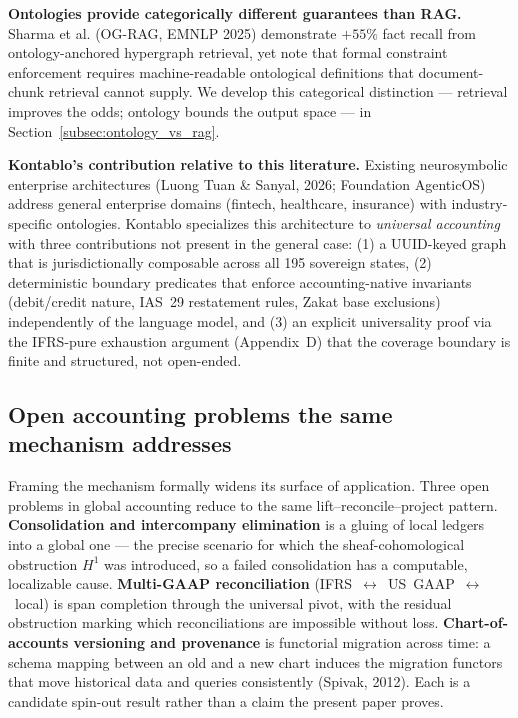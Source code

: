 \textbf{Ontologies provide categorically different guarantees than RAG.}
Sharma et al. (OG-RAG, EMNLP 2025) demonstrate $+55\%$ fact recall from
ontology-anchored hypergraph retrieval, yet note that formal constraint
enforcement requires machine-readable ontological definitions that
document-chunk retrieval cannot supply. We develop this categorical distinction
--- retrieval improves the odds; ontology bounds the output space --- in
Section~\ref{subsec:ontology_vs_rag}.

\textbf{Kontablo's contribution relative to this literature.}
Existing neurosymbolic enterprise architectures (Luong Tuan \& Sanyal, 2026;
Foundation AgenticOS) address general enterprise domains (fintech, healthcare,
insurance) with industry-specific ontologies. Kontablo specializes this
architecture to \emph{universal accounting} with three contributions not
present in the general case: (1) a UUID-keyed graph that is jurisdictionally
composable across all 195 sovereign states, (2) deterministic boundary
predicates that enforce accounting-native invariants (debit/credit nature,
IAS~29 restatement rules, Zakat base exclusions) independently of the
language model, and (3) an explicit universality proof via the IFRS-pure
exhaustion argument (Appendix~D) that the coverage boundary is finite and
structured, not open-ended.

\subsection{Open accounting problems the same mechanism addresses}
Framing the mechanism formally widens its surface of application. Three open problems in
global accounting reduce to the same lift--reconcile--project pattern. \textbf{Consolidation
and intercompany elimination} is a gluing of local ledgers into a global one --- the precise
scenario for which the sheaf-cohomological obstruction $H^{1}$ was introduced, so a failed
consolidation has a computable, localizable cause. \textbf{Multi-GAAP reconciliation}
(IFRS~$\leftrightarrow$~US~GAAP~$\leftrightarrow$~local) is span completion through the
universal pivot, with the residual obstruction marking which reconciliations are impossible
without loss. \textbf{Chart-of-accounts versioning and provenance} is functorial migration
across time: a schema mapping between an old and a new chart induces the migration functors
that move historical data and queries consistently (Spivak, 2012). Each is a candidate
spin-out result rather than a claim the present paper proves.

